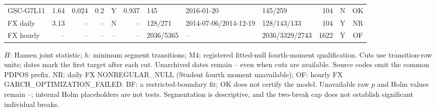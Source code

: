 \begin{longtable}{lrrrcrlllrcc}
GSC-G7L11 & 1.64 & 0.024 & 0.2 & Y & 0.937 & 145 & 2016-01-20 & 145/259 & 104 & N & OK\\
FX daily & 3.13 & -- & -- & N & -- & 128/271 & 2014-07-06/2014-12-19 & 128/143/133 & 104 & Y & NR\\
FX hourly & -- & -- & -- & -- & -- & 2036/5365 & -- & 2036/3329/2743 & 1622 & Y & OF\\
\end{longtable}
\noindent\parbox{\linewidth}{\fontsize{8}{9.2}\selectfont $H$: Hansen joint statistic; $h$: minimum segment transitions; M4: registered fitted-null fourth-moment qualification. Cuts use transition-row units; dates mark the first target after each cut. Unarchived dates remain -- even when cuts are available. Source codes omit the common PDPOS prefix. NR: daily FX NONREGULAR\_NULL (Student fourth moment unavailable); OF: hourly FX GARCH\_OPTIMIZATION\_FAILED. BF: a restricted-boundary fit; OK does not certify the model. Unavailable raw $p$ and Holm values remain --; internal Holm placeholders are not tests. Segmentation is descriptive, and the two-break cap does not establish significant individual breaks.}
\endgroup
